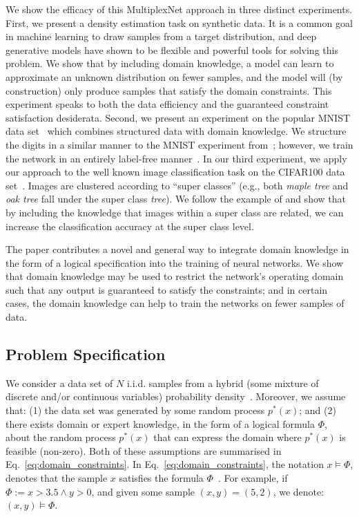 \documentclass[letterpaper]{article} %
\begin{document}
We  show the efficacy of this {MultiplexNet} approach in three distinct experiments.
First, we present a density estimation task on synthetic data. 
It is a common goal in machine learning to draw samples from a target distribution, and deep generative models have shown to be flexible and powerful tools for solving this problem.
We show that by including domain knowledge, a model can learn to approximate an unknown distribution on fewer samples, and the model will (by construction) only produce samples that satisfy the domain constraints.
This experiment speaks to both the data efficiency and the guaranteed constraint satisfaction desiderata. 
Second, we present an experiment on the popular MNIST data set~\citep{lecun2010mnist} which combines structured data with domain knowledge.
We structure the digits in a similar manner to the MNIST experiment from~\citet{manhaeve2018deepproblog}; however, we train the network in an entirely label-free manner~\citep{stewart2017label}.
In our third experiment, we apply our approach to the well known image classification task on the CIFAR100 data set~\citep{krizhevsky2009learning}. 
Images are clustered according to ``super classes'' (e.g., both \textit{maple tree} and \textit{oak tree} fall under the super class \textit{tree}).
We follow the example of \citet{fischer2018dl2} and show that by including the knowledge that images within a super class are related, we can increase the classification accuracy at the super class level.

The paper contributes a novel and general way to integrate domain knowledge in the form of a logical specification into the training of neural networks.
We show that domain knowledge may be used to restrict the network's operating domain such that any output is guaranteed to satisfy the constraints; and in certain cases, the domain knowledge can help to train the networks on fewer samples of data.


\subsection{Problem Specification}
We consider a data set of $N$ i.i.d. samples from a hybrid (some mixture of discrete and/or continuous variables) probability density~\citep{belle2015probabilistic}.
Moreover, we assume that: (1) the data set was generated by some random process $p^*(x)$; and (2) there exists domain or expert knowledge, in the form of a logical formula $\Phi$, about the random process $p^*(x)$ that can express the domain where $p^*(x)$ is feasible (non-zero).
Both of these assumptions are summarised in Eq.~\ref{eq:domain_constraints}. 
In Eq.~\ref{eq:domain_constraints}, the notation $x \models \Phi$, denotes that the sample $x$ satisfies the formula $\Phi$~\citep{barrett2009handbook}. 
For example, if $\Phi := x > 3.5 \land y > 0$, and given some sample $(x, y) = (5, 2)$, we denote: $(x, y) \models \Phi$.
\end{document}
